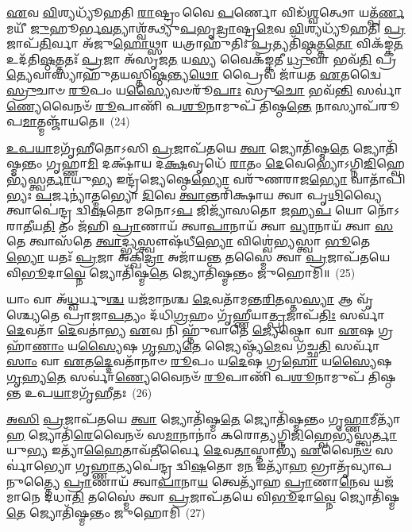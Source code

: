 \-\ul{𑌏}\-𑌵 \ul{𑌵𑌿}\-𑌶𑍍𑌯𑌧𑍍𑌯𑍂᳴𑌹𑌤𑌿 \ul{𑌰𑌾}\-𑌷𑍍𑌟𑍍𑌰𑌂 𑌵𑍈 \ul{𑌪}\-𑌰𑍍𑌣𑍋 𑌵𑌿𑌡᳴\-\ul{𑌶𑍍𑌵}\-𑌤𑍍𑌥𑍋 𑌯𑌤𑍍𑌪᳴\-\ul{𑌰𑍍𑌣}\-𑌮𑌯𑍀᳴ \ul{𑌜𑍁}\-𑌹𑍂𑌰𑍍𑌭\-\ul{𑌵}\-𑌤𑍍𑌯𑌾𑌶𑍍𑌵᳴𑌤𑍍𑌥𑍍𑌯𑍁\-\ul{𑌪}\-𑌭𑍃\-\ul{𑌦𑍍𑌰𑌾}\-𑌷𑍍𑌟𑍍𑌰\-\ul{𑌮𑍇}\-𑌵 \ul{𑌵𑌿}\-𑌶𑍍𑌯𑌧𑍍𑌯𑍂᳴𑌹𑌤𑌿 \ul{𑌪𑍍𑌰}\-𑌜𑌾𑌪᳴\-\ul{𑌤𑌿}\-𑌰𑍍𑌵𑌾 𑌅᳴𑌜𑍁\-\ul{𑌹𑍋}\-𑌥𑍍𑌸𑌾 𑌯𑌤𑍍𑌰𑌾𑌹𑍁᳴𑌤𑌿𑌃 \ul{𑌪𑍍𑌰}\-𑌤𑍍𑌯𑌤𑌿᳴\-\ul{𑌷𑍍𑌠}\-𑌤𑍍𑌤\-\ul{𑌤𑍋} 𑌵𑌿𑌕᳴𑌙𑍍𑌕\-\ul{𑌤} 𑌉𑌦᳴𑌤𑌿\-\ul{𑌷𑍍𑌠}\-𑌤𑍍𑌤𑌤𑌃᳴ \ul{𑌪𑍍𑌰}\-𑌜𑌾 𑌅᳴𑌸𑍃𑌜\-\ul{𑌤} 𑌯\-\ul{𑌸𑍍𑌯} 𑌵𑍈𑌕᳴𑌙𑍍𑌕𑌤𑍀 \ul{𑌧𑍍𑌰𑍁}\-𑌵𑌾 𑌭𑌵᳴\-\ul{𑌤𑌿} 𑌪𑍍𑌰\-\ul{𑌤𑍍𑌯𑍇}\-𑌵𑌾𑌸𑍍𑌯𑌾𑌹𑍁᳴𑌤𑌯𑌸𑍍𑌤𑌿\-\ul{𑌷𑍍𑌠}\-𑌨𑍍𑌤𑍍𑌯\-\ul{𑌥𑍋} 𑌪𑍍𑌰𑍈𑌵 𑌜𑌾᳴𑌯𑌤 \ul{𑌏}\-𑌤𑌦𑍍𑌵𑍈 \ul{𑌸𑍍𑌰𑍁}\-𑌚𑌾𑍞 \ul{𑌰𑍂}\-𑌪𑌂 𑌯\-\ul{𑌸𑍍𑌯𑍈}\-𑌵𑍞𑌰𑍂᳴\-\ul{𑌪𑌾𑌃} 𑌸𑍍𑌰𑍁\-\ul{𑌚𑍋} 𑌭𑌵᳴\-\ul{𑌨𑍍𑌤𑌿} 𑌸𑌰𑍍𑌵𑌾॑\-\ul{𑌣𑍍𑌯𑍇}\-𑌵𑍈𑌨𑍞᳴ \ul{𑌰𑍂}\-𑌪𑌾𑌣𑌿᳴ 𑌪\-\ul{𑌶𑍂}\-𑌨𑌾𑌮𑍁𑌪᳴ 𑌤𑌿𑌷𑍍𑌠\-\ul{𑌨𑍍𑌤𑍇} 𑌨𑌾𑌸𑍍𑌯𑌾𑌪᳴𑌰𑍂𑌪\-\ul{𑌮𑌾}\-𑌤𑍍𑌮𑌞𑍍𑌜𑌾᳴𑌯𑌤𑍇॥~(24)

{\anuvakamend[{\-\ul{𑌜𑍁}\-𑌹𑍂𑌰\-\ul{𑌥𑍋} 𑌬𑍍𑌰𑌹𑍍𑌮᳴ \ul{𑌸𑍍𑌰𑍁}\-𑌚𑌾𑍞 \ul{𑌸}\-𑌪𑍍𑌤𑌦᳴𑌶 𑌚}]}%

\-\ul{𑌉}\-\-\ul{𑌪}\-\-\ul{𑌯𑌾}\-𑌮𑌗𑍃᳴𑌹𑍀𑌤𑍋\-𑌽𑌸𑌿 \ul{𑌪𑍍𑌰}\-𑌜𑌾𑌪᳴𑌤𑌯𑍇 \ul{𑌤𑍍𑌵𑌾} 𑌜𑍍𑌯𑍋𑌤𑌿᳴𑌷𑍍𑌮\-\ul{𑌤𑍇} 𑌜𑍍𑌯𑍋𑌤𑌿᳴𑌷𑍍𑌮𑌨𑍍𑌤𑌂 𑌗𑍃𑌹𑍍𑌣𑌾\-\ul{𑌮𑌿} 𑌦𑌕𑍍𑌷𑌾᳴𑌯 𑌦\-\ul{𑌕𑍍𑌷}\-𑌵𑍃𑌧𑍇᳴ \ul{𑌰𑌾}\-𑌤𑌂 \ul{𑌦𑍇}\-𑌵𑍇𑌭𑍍𑌯𑍋॑\-𑌽𑌗𑍍𑌨𑌿\-\ul{𑌜𑌿}\-𑌹𑍍𑌵𑍇𑌭𑍍𑌯᳴\-𑌸𑍍𑌤𑍍𑌵\-\ul{𑌰𑍍𑌤𑌾}\-𑌯𑍁\-\ul{𑌭𑍍𑌯} 𑌇𑌨𑍍𑌦𑍍𑌰᳴𑌜𑍍𑌯𑍇𑌷𑍍𑌠𑍇\-\ul{𑌭𑍍𑌯𑍋} 𑌵𑌰𑍁᳴𑌣𑌰𑌾𑌜\-\ul{𑌭𑍍𑌯𑍋} 𑌵𑌾𑌤𑌾᳴𑌪𑌿𑌭𑍍𑌯𑌃 \ul{𑌪}\-𑌰𑍍𑌜𑌨𑍍𑌯𑌾॑𑌤𑍍𑌮𑌭𑍍𑌯𑍋 \ul{𑌦𑌿}\-𑌵𑍇 \ul{𑌤𑍍𑌵𑌾}\-𑌨𑍍𑌤𑌰𑌿᳴𑌕𑍍𑌷𑌾𑌯 𑌤𑍍𑌵𑌾 𑌪𑍃\-\ul{𑌥𑌿}\-𑌵𑍍𑌯𑍈 𑌤𑍍𑌵𑌾𑌪𑍇॑𑌨𑍍𑌦𑍍𑌰 𑌦𑍍𑌵𑌿\-\ul{𑌷}\-𑌤𑍋 𑌮𑌨𑍋\-𑌽\-\ul{𑌪} 𑌜𑌿𑌜𑍍𑌯𑌾᳴𑌸𑌤𑍋 \ul{𑌜}\-𑌹𑍍𑌯\-\ul{𑌪} 𑌯𑍋 𑌨𑍋᳴\-𑌽𑌰𑌾\-\ul{𑌤𑍀}\-𑌯\-\ul{𑌤𑌿} 𑌤𑌂 𑌜᳴𑌹𑌿 \ul{𑌪𑍍𑌰𑌾}\-𑌣𑌾𑌯᳴ 𑌤𑍍𑌵𑌾\-\ul{𑌪𑌾}\-𑌨𑌾𑌯᳴ 𑌤𑍍𑌵𑌾 \ul{𑌵𑍍𑌯𑌾}\-𑌨𑌾𑌯᳴ 𑌤𑍍𑌵𑌾 \ul{𑌸}\-𑌤𑍇 𑌤𑍍𑌵𑌾𑌸᳴𑌤𑍇 \ul{𑌤𑍍𑌵𑌾}\-𑌦𑍍𑌭𑍍𑌯𑌸𑍍𑌤𑍍𑌵𑍗𑌷᳴𑌧𑍀\-\ul{𑌭𑍍𑌯𑍋} 𑌵𑌿𑌶𑍍𑌵𑍇॑𑌭𑍍𑌯𑌸𑍍𑌤𑍍𑌵𑌾 \ul{𑌭𑍂}\-𑌤𑍇\-\ul{𑌭𑍍𑌯𑍋} 𑌯𑌤𑌃᳴ \ul{𑌪𑍍𑌰}\-𑌜𑌾 𑌅𑌕𑍍𑌖𑌿᳴\-\ul{𑌦𑍍𑌰𑌾} 𑌅𑌜𑌾᳴𑌯\-\ul{𑌨𑍍𑌤} 𑌤𑌸𑍍𑌮𑍈॑ 𑌤𑍍𑌵𑌾 \ul{𑌪𑍍𑌰}\-𑌜𑌾𑌪᳴𑌤𑌯𑍇 𑌵𑌿\-\ul{𑌭𑍂}\-𑌦𑌾\-\ul{𑌵𑍍𑌨𑍇} 𑌜𑍍𑌯𑍋𑌤𑌿᳴𑌷𑍍𑌮\-\ul{𑌤𑍇} 𑌜𑍍𑌯𑍋𑌤𑌿᳴𑌷𑍍𑌮𑌨𑍍𑌤𑌂 𑌜𑍁𑌹𑍋𑌮𑌿॥~(25)

{\anuvakamend[{𑌓𑌷᳴𑌧𑍀\-\ul{𑌭𑍍𑌯}\-𑌶𑍍𑌚𑌤𑍁᳴𑌰𑍍𑌦𑌶 𑌚}]}%

𑌯𑌾𑌂 𑌵𑌾 𑌅᳴\-\ul{𑌧𑍍𑌵}\-𑌰𑍍𑌯𑍁\-\ul{𑌶𑍍𑌚} 𑌯𑌜᳴𑌮𑌾𑌨𑌶𑍍𑌚 \ul{𑌦𑍇}\-𑌵𑌤𑌾᳴𑌮𑌨𑍍𑌤\-\ul{𑌰𑌿}\-𑌤𑌸𑍍𑌤\-\ul{𑌸𑍍𑌯𑌾} 𑌆 𑌵𑍃᳴𑌶𑍍𑌚𑍍𑌯𑍇𑌤𑍇 𑌪𑍍𑌰𑌾𑌜𑌾\-\ul{𑌪}\-𑌤𑍍𑌯𑌂 𑌦᳴𑌧𑌿\-\ul{𑌗𑍍𑌰}\-𑌹𑌂 𑌗𑍃᳴𑌹𑍍𑌣𑍀𑌯𑌾\-\ul{𑌤𑍍𑌪𑍍𑌰}\-𑌜𑌾𑌪᳴\-\ul{𑌤𑌿𑌃} 𑌸𑌰𑍍𑌵𑌾᳴ \ul{𑌦𑍇}\-𑌵𑌤𑌾᳴ \ul{𑌦𑍇}\-𑌵𑌤𑌾॑𑌭𑍍𑌯 \ul{𑌏}\-𑌵 𑌨𑌿 𑌹𑍍𑌨𑍁᳴𑌵𑌾𑌤𑍇 \ul{𑌜𑍍𑌯𑍇}\-𑌷𑍍𑌠𑍋 𑌵𑌾 \ul{𑌏}\-𑌷 𑌗𑍍𑌰𑌹𑌾᳴\-\ul{𑌣𑌾𑌂} 𑌯\-\ul{𑌸𑍍𑌯𑍈}\-𑌷 \ul{𑌗𑍃}\-𑌹𑍍𑌯\-\ul{𑌤𑍇} 𑌜𑍍𑌯𑍈𑌷𑍍𑌠𑍍𑌯᳴\-\ul{𑌮𑍇}\-𑌵 𑌗᳴𑌚𑍍𑌛\-\ul{𑌤𑌿} 𑌸𑌰𑍍𑌵𑌾᳴\-\ul{𑌸𑌾𑌂} 𑌵𑌾 \ul{𑌏}\-𑌤\-\ul{𑌦𑍍𑌦𑍇}\-𑌵𑌤𑌾᳴𑌨𑌾𑍞 \ul{𑌰𑍂}\-𑌪𑌂 𑌯\-\ul{𑌦𑍇}\-𑌷 𑌗𑍍𑌰\-\ul{𑌹𑍋} 𑌯\-\ul{𑌸𑍍𑌯𑍈}\-𑌷 \ul{𑌗𑍃}\-𑌹𑍍𑌯\-\ul{𑌤𑍇} 𑌸𑌰𑍍𑌵𑌾॑\-\ul{𑌣𑍍𑌯𑍇}\-𑌵𑍈𑌨𑍞᳴ \ul{𑌰𑍂}\-𑌪𑌾𑌣𑌿᳴ 𑌪\-\ul{𑌶𑍂}\-𑌨𑌾𑌮𑍁𑌪᳴ 𑌤𑌿𑌷𑍍𑌠𑌨𑍍𑌤 𑌉𑌪\-\ul{𑌯𑌾}\-𑌮𑌗𑍃᳴𑌹𑍀𑌤𑌃~(26)

\-\ul{𑌅}\-\-\ul{𑌸𑌿} \ul{𑌪𑍍𑌰}\-𑌜𑌾𑌪᳴𑌤𑌯𑍇 \ul{𑌤𑍍𑌵𑌾} 𑌜𑍍𑌯𑍋𑌤𑌿᳴𑌷𑍍𑌮\-\ul{𑌤𑍇} 𑌜𑍍𑌯𑍋𑌤𑌿᳴𑌷𑍍𑌮𑌨𑍍𑌤𑌂 𑌗𑍃\-\ul{𑌹𑍍𑌣𑌾}\-𑌮𑍀𑌤𑍍𑌯𑌾᳴\-\ul{𑌹} 𑌜𑍍𑌯𑍋𑌤𑌿᳴\-\ul{𑌰𑍇}\-𑌵𑍈𑌨𑍞᳴ 𑌸\-\ul{𑌮𑌾}\-𑌨𑌾𑌨𑌾𑌂॑ 𑌕𑌰𑍋𑌤𑍍𑌯𑌗𑍍𑌨𑌿\-\ul{𑌜𑌿}\-𑌹𑍍𑌵𑍇𑌭𑍍𑌯᳴𑌸𑍍𑌤𑍍𑌵\-\ul{𑌰𑍍𑌤𑌾}\-𑌯𑍁\-\ul{𑌭𑍍𑌯} 𑌇𑌤𑍍𑌯𑌾᳴\-\ul{𑌹𑍈}\-𑌤𑌾𑌵᳴\-\ul{𑌤𑍀}\-𑌰𑍍𑌵𑍈 \ul{𑌦𑍇}\-𑌵\-\ul{𑌤𑌾}\-𑌸𑍍𑌤𑌾𑌭𑍍𑌯᳴ \ul{𑌏}\-𑌵𑍈\-\ul{𑌨}\-\-\ul{𑍞} 𑌸𑌰𑍍𑌵𑌾॑𑌭𑍍𑌯𑍋 𑌗𑍃\-\ul{𑌹𑍍𑌣𑌾}\-𑌤𑍍𑌯𑌪𑍇॑𑌨𑍍𑌦𑍍𑌰 𑌦𑍍𑌵𑌿\-\ul{𑌷}\-𑌤𑍋 𑌮\-\ul{𑌨} 𑌇𑌤𑍍𑌯𑌾᳴\-\ul{𑌹} 𑌭𑍍𑌰𑌾𑌤𑍃᳴𑌵𑍍𑌯𑌾𑌪𑌨𑍁𑌤𑍍𑌤𑍍𑌯𑍈 \ul{𑌪𑍍𑌰𑌾}\-𑌣𑌾𑌯᳴ 𑌤𑍍𑌵𑌾\-\ul{𑌪𑌾}\-𑌨𑌾\-\ul{𑌯} 𑌤𑍍𑌵𑍇𑌤𑍍𑌯𑌾᳴𑌹 \ul{𑌪𑍍𑌰𑌾}\-𑌣𑌾\-\ul{𑌨𑍇}\-𑌵 𑌯𑌜᳴𑌮𑌾𑌨𑍇 𑌦𑌧𑌾\-\ul{𑌤𑌿} 𑌤𑌸𑍍𑌮𑍈॑ 𑌤𑍍𑌵𑌾 \ul{𑌪𑍍𑌰}\-𑌜𑌾𑌪᳴𑌤𑌯𑍇 𑌵𑌿\-\ul{𑌭𑍂}\-𑌦𑌾\-\ul{𑌵𑍍𑌨𑍇} 𑌜𑍍𑌯𑍋𑌤𑌿᳴𑌷𑍍𑌮\-\ul{𑌤𑍇} 𑌜𑍍𑌯𑍋𑌤𑌿᳴𑌷𑍍𑌮𑌨𑍍𑌤𑌂 𑌜𑍁𑌹𑍋𑌮𑌿~(27)

